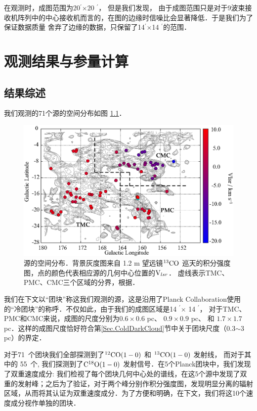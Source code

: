 \documentclass[UTF8, nocolorlinks]{pkuthss}
\newcommand{\cob}{$\rm ^{13}CO$ }
\newcommand{\coaa}{$\rm^{12}CO(1-0)$ }
\newcommand{\cobb}{$\rm^{13}CO(1-0)$ }
\newcommand{\cocc}{$\rm C^{18}O(1-0)$ }
\newcommand{\multi}{$\times$}
\newcommand{\vlsr}{${\rm V } _{lsr}$}
\newcommand{\arcmin}{$^{\prime}$}
\newcommand{\numsou}{71\ }
\newcommand{\numcocc}{55\ }
\begin{document}
        在观测时，成图范围为20\arcmin \multi 20 \arcmin ， 但是我们发现， 由于成图范围只是对于9波束接收机阵列中的中心接收机而言的，在图的边缘时信噪比会显著降低．于是我们为了保证数据质量 舍弃了边缘的数据，只保留了14\arcmin \multi 14 \arcmin 的范围．

\chapter{观测结果与参量计算}

	\section{结果综述}

		我们观测的71个源的空间分布如图 \ref{Fig.SpatialDistribution}．

		\begin{figure}[H]
			\centering
			\includegraphics[totalheight=82mm]{img_plot/SpatiaDist_Velocity_Overlay.eps}
			\caption{源的空间分布．背景灰度图来自 1.2 m 望远镜\cob 巡天的积分强度图\supercite{2001ApJ...547..792D}，点的颜色代表相应源的几何中心位置的\vlsr ．
			虚线表示TMC、PMC、CMC三个区域的分界，根据\parencite{2010A&A...512A..67L}．
			\label{Fig.SpatialDistribution}}
		\end{figure}

		我们在下文以“团块”称这我们观测的源，这是沿用了Planck Collaboration使用的“冷团块”的称呼\supercite{2011A&A...536A..23P}．不仅如此，由于我们的成图区域是14 \arcmin $\times$ 14 \arcmin ， 对于TMC、PMC和CMC来说，成图的尺度分别为$0.6\times0.6$ pc、 $0.9\times0.9$ pc、 和 $1.7\times1.7$ pc．这样的成图尺度恰好符合第\ref{Sec.ColdDarkCloud}节中关于团块尺度（0.3$\sim$3 pc）的界定．

		对于\numsou 个团块我们全部探测到了\coaa  和 \cobb 发射线， 而对于其中的 \numcocc 个, 我们探测到了\cocc 发射信号．在5个Planck团块中，我们发现了双重速度成分: 我们检视了每个团块几何中心处的谱线，在这5个源中发现了双重的发射峰；之后为了验证，对于两个峰分别作积分强度图，发现明显分离的辐射区域，从而将其认证为双重速度成分．为了方便和明确，在下文，我们将这10个速度成分视作单独的团块．
	
\end{document}
